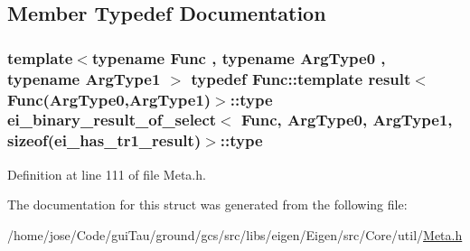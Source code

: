 \subsection{Member Typedef Documentation}
\hypertarget{structei__binary__result__of__select_3_01_func_00_01_arg_type0_00_01_arg_type1_00_01sizeof_07ei__has__tr1__result_08_4_a15a0531e16fefc333da8dab9944e48ec}{
\subsubsection[{type}]{\setlength{\rightskip}{0pt plus 5cm}template$<$typename Func , typename Arg\-Type0 , typename Arg\-Type1 $>$ typedef Func\-::template {\bf result}$<$Func(Arg\-Type0,Arg\-Type1)$>$\-::{\bf type} {\bf ei\-\_\-binary\-\_\-result\-\_\-of\-\_\-select}$<$ Func, Arg\-Type0, Arg\-Type1, sizeof({\bf ei\-\_\-has\-\_\-tr1\-\_\-result})$>$\-::{\bf type}}}\label{structei__binary__result__of__select_3_01_func_00_01_arg_type0_00_01_arg_type1_00_01sizeof_07ei__has__tr1__result_08_4_a15a0531e16fefc333da8dab9944e48ec}


Definition at line 111 of file Meta.\-h.



The documentation for this struct was generated from the following file\-:\begin{DoxyCompactItemize}
\item 
/home/jose/\-Code/gui\-Tau/ground/gcs/src/libs/eigen/\-Eigen/src/\-Core/util/\hyperlink{_meta_8h}{Meta.\-h}\end{DoxyCompactItemize}
